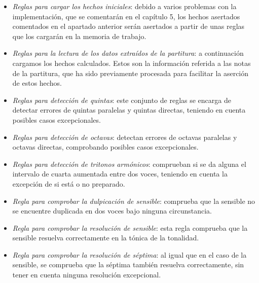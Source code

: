 \begin{itemize}

	\item \textit{Reglas para cargar los hechos iniciales}: debido a varios problemas con la implementación, que se comentarán en el capítulo 5, los hechos asertados comentados en el apartado anterior serán asertados a partir de unas reglas que los cargarán en la memoria de trabajo. 

	\bigskip

	\item \textit{Reglas para la lectura de los datos extraídos de la partitura}: a continuación cargamos los hechos calculados. Estos son la información referida a las notas de la partitura, que ha sido previamente procesada para facilitar la aserción de estos hechos.
 
	\bigskip

	\item \textit{Reglas para detección de quintas}: este conjunto de reglas se encarga de detectar errores de quintas paralelas y quintas directas, teniendo en cuenta posibles casos excepcionales.

	\bigskip

	\item \textit{Reglas para detección de octavas}: detectan errores de octavas paralelas y octavas directas, comprobando posibles casos excepcionales.

	\bigskip

	\item \textit{Reglas para detección de tritonos armónicos}: comprueban si se da alguna el intervalo de cuarta aumentada entre dos voces, teniendo en cuenta la excepción de si está o no preparado.

	\bigskip

	\item \textit{Regla para comprobar la dulpicación de sensible}: comprueba que la sensible no se encuentre duplicada en dos voces bajo ninguna circunstancia.

	\bigskip

	\item \textit{Regla para comprobar la resolución de sensible}: esta regla comprueba que la sensible resuelva correctamente en la tónica de la tonalidad.

	\bigskip

	\item \textit{Regla para comprobar la resolución de séptima}: al igual que en el caso de la sensible, se comprueba que la séptima también resuelva correctamente, sin tener en cuenta ninguna resolución excepcional.


\end{itemize}
